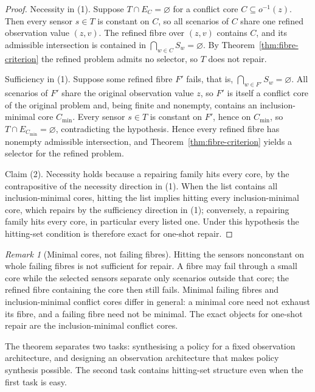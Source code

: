 \documentclass[11pt]{article}
\theoremstyle{plain}
\theoremstyle{definition}
\theoremstyle{remark}
\newtheorem{remark}[theorem]{Remark}
\begin{document}
\begin{proof}
Necessity in (1).  Suppose \(T\cap E_C=\varnothing\) for a conflict core
\(C\subseteq o^{-1}(z)\).  Then every sensor \(s\in T\) is constant on
\(C\), so all scenarios of \(C\) share one refined observation value
\((z,v)\).  The refined fibre over \((z,v)\) contains \(C\), and its
admissible intersection is contained in \(\bigcap_{w\in C}S_w=\varnothing\).
By Theorem~\ref{thm:fibre-criterion} the refined problem admits no selector,
so \(T\) does not repair.

Sufficiency in (1).  Suppose some refined fibre \(F'\) fails, that is,
\(\bigcap_{w\in F'}S_w=\varnothing\).  All scenarios of \(F'\) share the
original observation value \(z\), so \(F'\) is itself a conflict core of
the original problem and, being finite and nonempty, contains an
inclusion-minimal core \(C_{\min}\).  Every sensor \(s\in T\) is constant
on \(F'\), hence on \(C_{\min}\), so \(T\cap E_{C_{\min}}=\varnothing\),
contradicting the hypothesis.  Hence every refined fibre has nonempty
admissible intersection, and Theorem~\ref{thm:fibre-criterion} yields a
selector for the refined problem.

Claim (2).  Necessity holds because a repairing family hits every core, by
the contrapositive of the necessity direction in (1).  When the list
contains all inclusion-minimal cores, hitting the list implies hitting every
inclusion-minimal core, which repairs by the sufficiency direction in (1);
conversely, a repairing family hits every core, in particular every listed
one.  Under this hypothesis the hitting-set condition is therefore exact for
one-shot repair.
\end{proof}

\begin{remark}[Minimal cores, not failing fibres]
\label{rem:cores-vs-fibres}
Hitting the sensors nonconstant on whole failing fibres is not sufficient for
repair.  A fibre may fail through a small core while the selected sensors
separate only scenarios outside that core; the refined fibre containing the
core then still fails.  Minimal failing fibres and inclusion-minimal conflict
cores differ in general: a minimal core need not exhaust its fibre, and a
failing fibre need not be minimal.  The exact objects for one-shot repair are
the inclusion-minimal conflict cores.
\end{remark}

The theorem separates two tasks: synthesising a policy for a fixed observation
architecture, and designing an observation architecture that makes policy
synthesis possible.  The second task contains hitting-set structure even when
the first task is easy.
\end{document}
